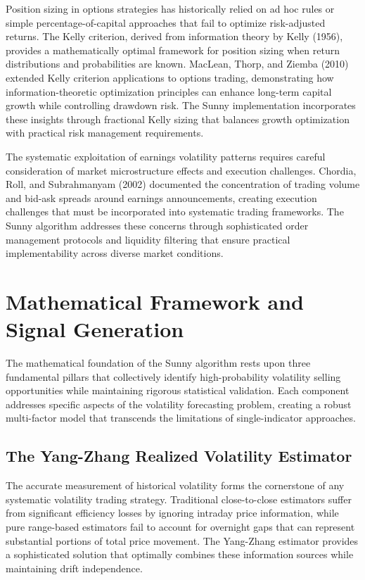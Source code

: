 \documentclass[
  american,
  11pt,
  11pt,
  letterpaper,
  onecolumn]{article}
\begin{document}
Position sizing in options strategies has historically relied on ad hoc
rules or simple percentage-of-capital approaches that fail to optimize
risk-adjusted returns. The Kelly criterion, derived from information
theory by Kelly (1956), provides a mathematically optimal framework for
position sizing when return distributions and probabilities are known.
MacLean, Thorp, and Ziemba (2010) extended Kelly criterion applications
to options trading, demonstrating how information-theoretic optimization
principles can enhance long-term capital growth while controlling
drawdown risk. The Sunny implementation incorporates these insights
through fractional Kelly sizing that balances growth optimization with
practical risk management requirements.

The systematic exploitation of earnings volatility patterns requires
careful consideration of market microstructure effects and execution
challenges. Chordia, Roll, and Subrahmanyam (2002) documented the
concentration of trading volume and bid-ask spreads around earnings
announcements, creating execution challenges that must be incorporated
into systematic trading frameworks. The Sunny algorithm addresses these
concerns through sophisticated order management protocols and liquidity
filtering that ensure practical implementability across diverse market
conditions.

\section{Mathematical Framework and Signal
Generation}\label{mathematical-framework-and-signal-generation}

The mathematical foundation of the Sunny algorithm rests upon three
fundamental pillars that collectively identify high-probability
volatility selling opportunities while maintaining rigorous statistical
validation. Each component addresses specific aspects of the volatility
forecasting problem, creating a robust multi-factor model that
transcends the limitations of single-indicator approaches.

\subsection{The Yang-Zhang Realized Volatility
Estimator}\label{the-yang-zhang-realized-volatility-estimator}

The accurate measurement of historical volatility forms the cornerstone
of any systematic volatility trading strategy. Traditional
close-to-close estimators suffer from significant efficiency losses by
ignoring intraday price information, while pure range-based estimators
fail to account for overnight gaps that can represent substantial
portions of total price movement. The Yang-Zhang estimator provides a
sophisticated solution that optimally combines these information sources
while maintaining drift independence.
\end{document}
